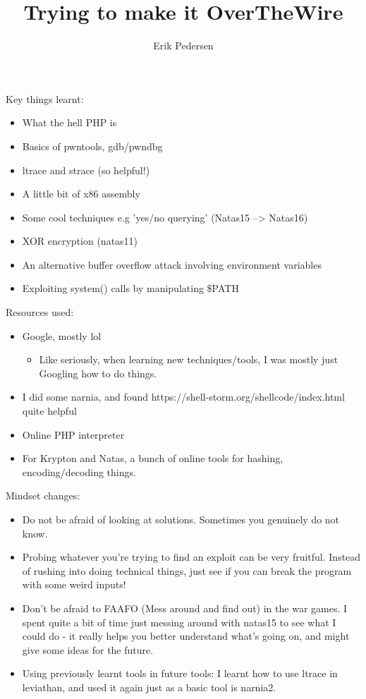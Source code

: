 \documentclass{article}
\title{Trying to make it OverTheWire}
\author{Erik Pedersen}
\begin{document}
Key things learnt:
\begin{itemize}
	\item What the hell PHP is
	\item Basics of pwntools, gdb/pwndbg
	\item ltrace and strace (so helpful!)
	\item A little bit of x86 assembly
	\item Some cool techniques e.g 'yes/no querying' (Natas15 --> Natas16)
	\item XOR encryption (natas11)
	\item An alternative buffer overflow attack involving environment variables
	\item Exploiting system() calls by manipulating \$PATH
\end{itemize}
Resources used:

\begin{itemize}
	\item Google, mostly lol
		\begin{itemize}
			\item Like seriously, when learning new techniques/tools, I was mostly just Googling how to do things.
		\end{itemize}
	\item I did some narnia, and found https://shell-storm.org/shellcode/index.html quite helpful
	\item Online PHP interpreter
	\item For Krypton and Natas, a bunch of online tools for hashing, encoding/decoding things.

\end{itemize}

Mindset changes:

\begin{itemize}

	\item Do not be afraid of looking at solutions. Sometimes you genuinely do not know.
	\item Probing whatever you're trying to find an exploit can be very fruitful. Instead of rushing into doing technical things, just see if you can break the program with some weird inputs!
	\item Don't be afraid to FAAFO (Mess around and find out) in the war games. I spent quite a bit of time just messing around with natas15 to see what I could do - it really helps you better understand what's going on, and might give some ideas for the future.
	\item Using previously learnt tools in future tools: I learnt how to use ltrace in leviathan, and used it again just as a basic tool is narnia2.

\end{itemize}
\end{document}
